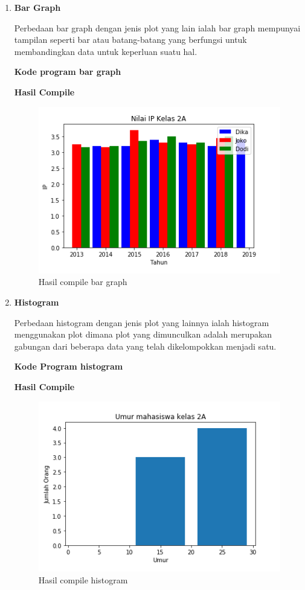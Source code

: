 \begin{enumerate}
	\item \textbf{Bar Graph}
	
	Perbedaan bar graph dengan jenis plot yang lain ialah bar graph mempunyai tampilan seperti bar atau batang-batang yang berfungsi untuk membandingkan data untuk keperluan suatu hal.
	
	\textbf{Kode program bar graph}
	
	
	
	\textbf{Hasil Compile}
	
	\begin{figure}[H]
		\includegraphics{figures/6/1174021/3.png}
		\centering
		\caption{Hasil compile bar graph}
	\end{figure}
	
	\item \textbf{Histogram}
	
	Perbedaan histogram dengan jenis plot yang lainnya ialah histogram menggunakan plot dimana plot yang dimunculkan adalah merupakan gabungan dari beberapa data yang telah dikelompokkan menjadi satu.
	
	\textbf{Kode Program histogram}
	
	
	
	\textbf{Hasil Compile}
	
	\begin{figure}[H]
		\includegraphics[width=12cm]{figures/6/1174021/31.png}
		\centering
		\caption{Hasil compile histogram}
	\end{figure}
	

\end{enumerate}

